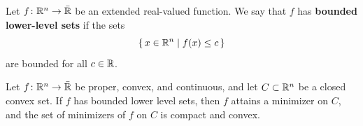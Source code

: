 



\begin{definition}
    Let $f\colon\mathbb{R}^n\to\bar{\mathbb{R}}$ be an extended real-valued function. We say that $f$ has \textbf{bounded lower-level
    sets} if the sets
    \[
        \{\, x\in\mathbb{R}^n \mid f(x) \leq c \,\}
    \]
    are bounded for all $c\in\mathbb{R}$.
\end{definition}

\begin{proposition}
    \label{prop:convex+bounded-lower-level-sets-implies-minimizer}
    Let $f\colon\mathbb{R}^n\to\bar{\mathbb{R}}$ be proper, convex, and continuous, and let $C\subset\mathbb{R}^n$ be a closed convex set.
    If $f$ has bounded lower level sets, then $f$ attains a minimizer on $C$, and the set of minimizers of $f$
    on $C$ is compact and convex.
\end{proposition}


